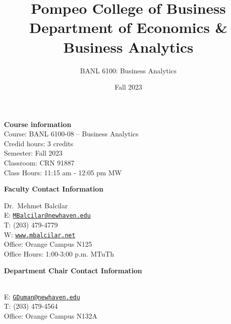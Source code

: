 \documentclass[11pt,]{article}
\title{\textcolor{unhtext}{Pompeo College of Business\\
Department of Economics \& Business Analytics}}
\subtitle{\textcolor{unhtext}{BANL 6100: Business Analytics}}
\date{\textcolor{unhtext}{Fall 2023}}
\begin{document}
  

		\maketitle
		
	
		\thispagestyle{firststyle}


\vspace{-12pt}
\noindent\Large{\textbf{\textcolor{unhtext}{Course information}}}\vspace{3pt}\\
  Course: BANL 6100-08 -- Business Analytics\\
  Credid hours: 3 credits\\
  Semester: Fall 2023\\
  Classroom: CRN 91887\\
  Class Hours: 11:15 am - 12:05 pm MW

\vspace{10pt}
\noindent\textbf{\Large{\textcolor{unhtext}{Faculty Contact Information}}}
\vspace{-8pt}
\begin{multicols}{2}
  \noindent Dr.~Mehmet Balcilar\\
  E: \href{mailto:MBalcilar@newhaven.edu}{\nolinkurl{MBalcilar@newhaven.edu}}\\
    T: (203) 479-4779
  \\
   
  W: \href{http://www.mbalcilar.net}{\tt www.mbalcilar.net}
  \\
    Office: Orange Campus N125
  \\
    Office Hours: 1:00-3:00 p.m. MTuTh
  \\
    \columnbreak
    \end{multicols}
 
 \vspace{-20pt}

\noindent\textbf{\Large{\textcolor{unhtext}{Department Chair Contact Information}}}\\
\vspace{-26pt}
 \begin{multicols}{2}
\\
  E: \href{mailto:GDuman@newhaven.edu}{\nolinkurl{GDuman@newhaven.edu}}\\
  \vfill\columnbreak
  T: (203) 479-4564\\
  Office: Orange Campus N132A\\
\end{multicols}
\end{document}
